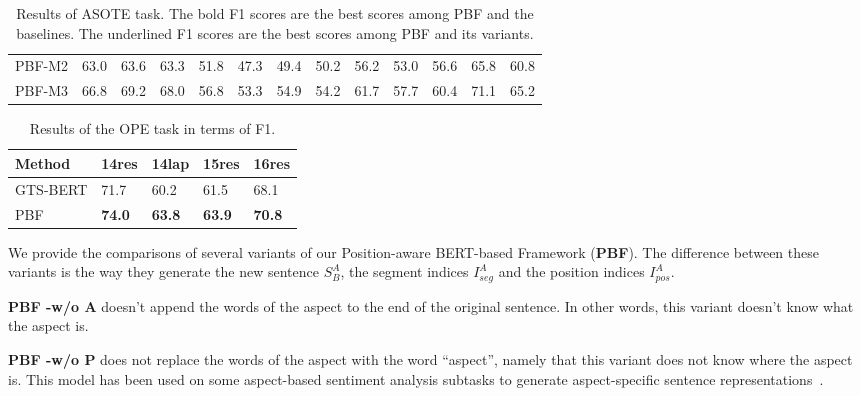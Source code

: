 \documentclass[11pt]{article}
\begin{document}
\begin{table*}
\begin{tabular}{|l|lll|lll|lll|lll|}
		PBF-M2          & 63.0                  & 63.6                  & 63.3                    & 51.8                  & 47.3                  & 49.4                    & 50.2                  & 56.2                  & 53.0                    & 56.6                  & 65.8                  & 60.8                    \\
		PBF-M3          & 66.8                  & 69.2                  & 68.0                    & 56.8                  & 53.3                  & 54.9                    & 54.2                  & 61.7                  & 57.7                    & 60.4                  & 71.1                  & 65.2                    \\ \hline
	\end{tabular}
	\caption{\label{table:ASOTE} Results of ASOTE task. The bold F1 scores are the best scores among PBF and the baselines. The underlined F1 scores are the best scores among PBF and its variants.}
\end{table*}

\begin{table}
	\centering
	\begin{tabular}{|l|l|l|l|l|}
		\hline
		Method   & 14res       & 14lap         & 15res         & 16res         \\ \hline
		GTS-BERT & 71.7        & 60.2          & 61.5          & 68.1          \\ \hline
		PBF      & \textbf{74.0} & \textbf{63.8} & \textbf{63.9} & \textbf{70.8} \\ \hline
	\end{tabular}
	\caption{\label{table:AOPE} Results of the OPE task in terms of F1.}
\end{table}

We provide the comparisons of several variants of our Position-aware BERT-based Framework (\textbf{PBF}).
The difference between these variants is the way they generate the new sentence $S^A_B$, the segment indices $I^A_{seg}$ and the position indices $I^A_{pos}$.

\textbf{PBF -w/o A} doesn't append the words of the aspect to the end of the original sentence. In other words, this variant doesn't know what the aspect is.

\textbf{PBF -w/o P} does not replace the words of the aspect with the word ``aspect'', namely that this variant does not know where the aspect is. This model has been used on some aspect-based sentiment analysis subtasks to generate aspect-specific sentence representations~\citep{jiang-etal-2019-challenge,li-etal-2020-multi-instance}.
\end{document}

